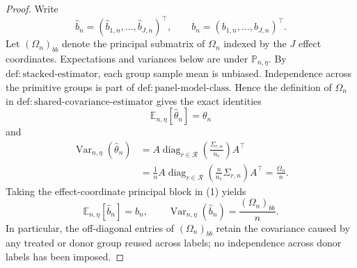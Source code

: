 \documentclass{article}
\begin{document}
\begin{proof}
Write
\[
 \widehat b_n=(\widehat b_{1,n},\ldots,\widehat b_{J,n})^{\top},
 \qquad
 b_n=(b_{1,n},\ldots,b_{J,n})^{\top}.
\]
Let \((\Omega_n)_{bb}\) denote the principal submatrix of \(\Omega_n\) indexed by the \(J\) effect coordinates. Expectations and variances below are under \(\mathbb P_{n,\eta}\). By \(\mathrm{def:stacked\text{-}estimator}\), each group sample mean is unbiased. Independence across the primitive groups is part of \(\mathrm{def:panel\text{-}model\text{-}class}\). Hence the definition of \(\Omega_n\) in \(\mathrm{def:shared\text{-}covariance\text{-}estimator}\) gives the exact identities
\[
 \mathbb E_{n,\eta}[\widehat\theta_n]=\theta_n
\]
and
\[
 \begin{aligned}
 \operatorname{Var}_{n,\eta}(\widehat\theta_n)
 &=A\operatorname{diag}_{r\in\mathcal R}
   \left(\frac{\Sigma_{r,n}}{n_r}\right)A^{\top}\\
 &=\frac1n A\operatorname{diag}_{r\in\mathcal R}
   \left(\frac n{n_r}\Sigma_{r,n}\right)A^{\top}
 =\frac{\Omega_n}{n}.
 \end{aligned}
 \tag{1}
\]
Taking the effect-coordinate principal block in (1) yields
\[
 \mathbb E_{n,\eta}[\widehat b_n]=b_n,
 \qquad
 \operatorname{Var}_{n,\eta}(\widehat b_n)
 =\frac{(\Omega_n)_{bb}}{n}.
 \tag{2}
\]
In particular, the off-diagonal entries of \((\Omega_n)_{bb}\) retain the covariance caused by any treated or donor group reused across labels; no independence across donor labels has been imposed.


\end{proof}
\end{document}
